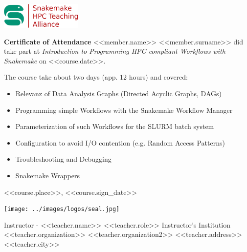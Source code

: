 \documentclass[a4paper,10pt]{article}
\begin{document}
\pagestyle{empty}
\begin{multicols}{2}
 \begin{minipage}{\textwidth}
  \includegraphics[width=4cm]{../images/logos/alliance_logo.png}
 \end{minipage}

 \columnbreak
\end{multicols}


\begin{center}
 \vfill
 \huge{\bf Certificate of Attendance}
 \vfill
 \Large{<<member.name>> <<member.surname>>}
 \vfill
 did take part at 
 \vfill
 \emph{Introduction to Programming HPC compliant Workflows with Snakemake}
 \vfill
 on <<course.date>>.
 \vfill
\end{center}

The course take about two days (app. 12 hours) and covered:
\begin{itemize}
  \item Relevanz of Data Analysis Graphs (Directed Acyclic Graphs, DAGs)
  \item Programming simple Workflows with the Snakemake Workflow Manager
  \item Parameterization of such Workflows for the SLURM batch system
  \item Configuration to avoid I/O contention (e.g. Random Access Patterns)
  \item Troubleshooting and Debugging
  \item Snakemake Wrappers
\end{itemize}

\vfill
<<course.place>>, <<course.sign_date>>

\begin{multicols}{3}
 \begin{minipage}[b][4cm][b]{0.4\textwidth}
   
  
 \end{minipage}%
 \columnbreak
 \begin{minipage}[b][4cm][b]{0.2\textwidth}
 \texttt{[image: ../images/logos/seal.jpg]}
 \end{minipage}%
 \columnbreak
 \begin{flushright}
 \raggedleft
 \begin{minipage}[b][4cm][b]{0.4\textwidth}
     Instructor - <<teacher.name>>\newline
     \footnotesize{<<teacher.role>>}\newline
  \phantom{H}
  Instructor's Institution\newline
  <<teacher.organization>> \newline
  <<teacher.organization2>> \newline
  <<teacher.address>>\newline
  <<teacher.city>>\newline
 \end{minipage}
 \end{flushright}

\end{multicols}
\end{document}
